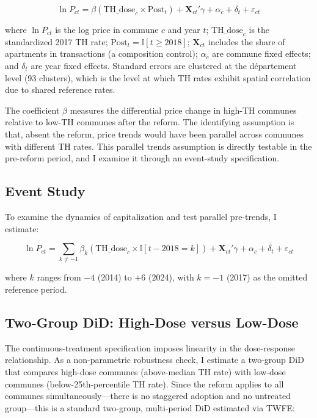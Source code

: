 \documentclass[12pt]{article}
\newcommand{\ind}{\mathbb{I}}
\begin{document}
\begin{equation}
\ln P_{ct} = \beta (\text{TH\_dose}_c \times \text{Post}_t) + \mathbf{X}_{ct}'\gamma + \alpha_c + \delta_t + \varepsilon_{ct}
\label{eq:main}
\end{equation}

\noindent where $\ln P_{ct}$ is the log price in commune $c$ and year $t$; $\text{TH\_dose}_c$ is the standardized 2017 TH rate; $\text{Post}_t = \ind[t \geq 2018]$; $\mathbf{X}_{ct}$ includes the share of apartments in transactions (a composition control); $\alpha_c$ are commune fixed effects; and $\delta_t$ are year fixed effects. Standard errors are clustered at the d\'{e}partement level (93 clusters), which is the level at which TH rates exhibit spatial correlation due to shared reference rates.

The coefficient $\beta$ measures the differential price change in high-TH communes relative to low-TH communes after the reform. The identifying assumption is that, absent the reform, price trends would have been parallel across communes with different TH rates. This parallel trends assumption is directly testable in the pre-reform period, and I examine it through an event-study specification.

\subsection{Event Study}

To examine the dynamics of capitalization and test parallel pre-trends, I estimate:

\begin{equation}
\ln P_{ct} = \sum_{k \neq -1} \beta_k (\text{TH\_dose}_c \times \ind[t - 2018 = k]) + \mathbf{X}_{ct}'\gamma + \alpha_c + \delta_t + \varepsilon_{ct}
\label{eq:eventstudy}
\end{equation}

\noindent where $k$ ranges from $-4$ (2014) to $+6$ (2024), with $k = -1$ (2017) as the omitted reference period.

\subsection{Two-Group DiD: High-Dose versus Low-Dose}

The continuous-treatment specification imposes linearity in the dose-response relationship. As a non-parametric robustness check, I estimate a two-group DiD that compares high-dose communes (above-median TH rate) with low-dose communes (below-25th-percentile TH rate). Since the reform applies to all communes simultaneously---there is no staggered adoption and no untreated group---this is a standard two-group, multi-period DiD estimated via TWFE:
\end{document}
